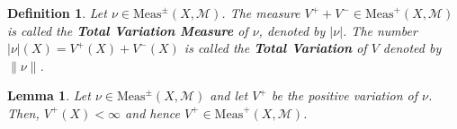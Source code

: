 \documentclass[letterpaper, 12pt]{article}
\newcommand{\cM}{\mathcal{M}}
\newcommand{\Meas}{\mathrm{Meas}}
\theoremstyle{stdthm}
\newtheorem{lem}[thm]{Lemma}
\theoremstyle{stddef}
\newtheorem{defn}[thm]{Definition}
\theoremstyle{stdnonum}
\theoremstyle{stdqands}
\theoremstyle{stdbold}
\begin{document}
\begin{defn}
Let $\nu \in \Meas^\pm(X,\cM)$. The measure $V^+ + V^- \in \Meas^+(X,\cM)$ is called the {\bf Total Variation Measure} of $\nu$, denoted by $|\nu|$. The number $|\nu|(X) = V^+(X) + V^-(X)$ is called the {\bf Total Variation} of $V$ denoted by $\|\nu\|$. 
\end{defn}


\begin{lem}
Let $\nu \in \Meas^\pm(X,\cM)$ and let $V^+$ be the positive variation of $\nu$. Then, $V^+(X) < \infty$ and hence $V^+ \in \Meas^+(X,\cM)$.
\end{lem}
\end{document}
